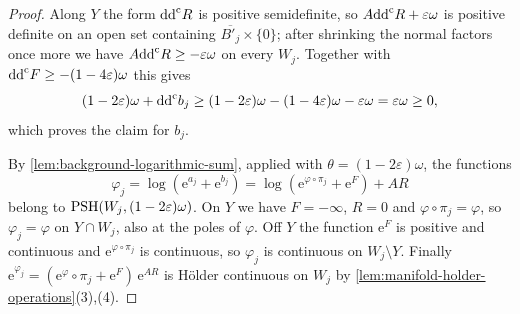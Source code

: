 \begin{proof}
Along $Y$ the form $\mathrm{dd}^{\mathrm{c}} R$ is positive semidefinite, so $A\mathrm{dd}^{\mathrm{c}} R+\varepsilon\omega$ is positive definite on an open set containing $\overline{B'_j}\times\{0\}$; after shrinking the normal factors once more we have $A\mathrm{dd}^{\mathrm{c}} R\geq-\varepsilon\omega$ on every $W_j$. Together with $\mathrm{dd}^{\mathrm{c}} F\geq-(1-4\varepsilon)\omega$ this gives
\[
 (1-2\varepsilon)\omega+\mathrm{dd}^{\mathrm{c}} b_j\geq(1-2\varepsilon)\omega-(1-4\varepsilon)\omega-\varepsilon\omega=\varepsilon\omega\geq0,
\]
which proves the claim for $b_j$.

By \cref{lem:background-logarithmic-sum}, applied with $\theta=(1-2\varepsilon)\omega$, the functions
\[
 \varphi_j=\log(\mathrm e^{a_j}+\mathrm e^{b_j})
          =\log(\mathrm e^{\varphi\circ\pi_j}+\mathrm e^F)+AR
\]
belong to $\mathrm{PSH}(W_j,(1-2\varepsilon)\omega)$. On $Y$ we have $F=-\infty$, $R=0$ and $\varphi\circ\pi_j=\varphi$, so $\varphi_j=\varphi$ on $Y\cap W_j$, also at the poles of $\varphi$. Off $Y$ the function $\mathrm e^F$ is positive and continuous and $\mathrm e^{\varphi\circ\pi_j}$ is continuous, so $\varphi_j$ is continuous on $W_j\setminus Y$. Finally $\mathrm e^{\varphi_j}=(\mathrm e^\varphi\circ\pi_j+\mathrm e^F)\,\mathrm e^{AR}$ is H\"older continuous on $W_j$ by \cref{lem:manifold-holder-operations}(3),(4).


\end{proof}
